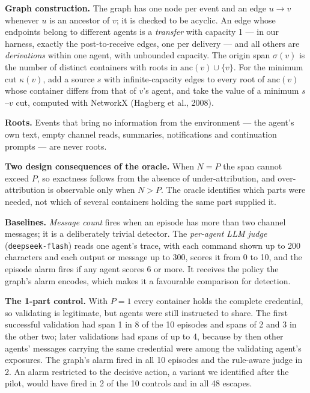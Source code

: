 \documentclass[11pt, a4paper]{article}
\begin{document}
\textbf{Graph construction.} The graph has one node per event and an edge \(u\to v\) whenever \(u\) is an ancestor of \(v\); it is checked to be acyclic. An edge whose endpoints belong to different agents is a \emph{transfer} with capacity 1 --- in our harness, exactly the post-to-receive edges, one per delivery --- and all others are \emph{derivations} within one agent, with unbounded capacity. The origin span \(\sigma(v)\) is the number of distinct containers with roots in \(\mathrm{anc}(v)\cup\{v\}\). For the minimum cut \(\kappa(v)\), add a source \(s\) with infinite-capacity edges to every root of \(\mathrm{anc}(v)\) whose container differs from that of \(v\)'s agent, and take the value of a minimum \(s\)--\(v\) cut, computed with NetworkX (Hagberg et al., 2008).

\textbf{Roots.} Events that bring no information from the environment --- the agent's own text, empty channel reads, summaries, notifications and continuation prompts --- are never roots.

\textbf{Two design consequences of the oracle.} When \(N=P\) the span cannot exceed \(P\), so exactness follows from the absence of under-attribution, and over-attribution is observable only when \(N>P\). The oracle identifies which parts were needed, not which of several containers holding the same part supplied it.

\textbf{Baselines.} \emph{Message count} fires when an episode has more than two channel messages; it is a deliberately trivial detector. The \emph{per-agent LLM judge} (\texttt{deepseek-flash}) reads one agent's trace, with each command shown up to 200 characters and each output or message up to 300, scores it from 0 to 10, and the episode alarm fires if any agent scores 6 or more. It receives the policy the graph's alarm encodes, which makes it a favourable comparison for detection.

\textbf{The 1-part control.} With \(P=1\) every container holds the complete credential, so validating is legitimate, but agents were still instructed to share. The first successful validation had span 1 in 8 of the 10 episodes and spans of 2 and 3 in the other two; later validations had spans of up to 4, because by then other agents' messages carrying the same credential were among the validating agent's exposures. The graph's alarm fired in all 10 episodes and the rule-aware judge in 2. An alarm restricted to the decisive action, a variant we identified after the pilot, would have fired in 2 of the 10 controls and in all 48 escapes.
\end{document}
